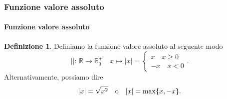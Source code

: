 \documentclass{article}
\theoremstyle{plain}
\theoremstyle{definition}
\newtheorem{defn}{Definizione}[section]
\theoremstyle{remark}
\begin{document}
\vspace{10pt}

\subsubsection{Funzione valore assoluto}

\vspace{10pt}

\paragraph{Funzione valore assoluto}
\begin{bxthm}
\begin{defn}
    Definiamo la funzione valore assoluto al seguente modo
    \[||:\,\mathbb{R}\to\mathbb{R}^+_0\quad x\mapsto |x|=\begin{cases}
        x\quad x\geq 0\\
        -x\quad x<0
    \end{cases}.\]
    Alternativamente, possiamo dire 
    \[|x|=\sqrt{x^2}\quad\textup{o}\quad |x|=\max\{x,-x\}.\]
\end{defn}
\end{bxthm}

\vspace{10pt}
\end{document}
